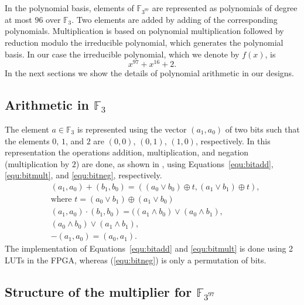 \documentclass{article}
\newcommand{\F}{\mathbb{F}}
\begin{document}
In the polynomial basis, elements of $\F_{3^{97}}$ are represented as
polynomials of degree at most $96$ over $\F_3$. Two elements are added
by adding of the corresponding polynomials. Multiplication is based on polynomial
multiplication followed by reduction modulo the irreducible polynomial,
which generates the polynomial basis. In our case the irreducible
polynomial, which we denote by $f(x)$, is 
\begin{equation}
x^{97}+x^{16}+2.
\label{equ:irreducible}
\end{equation}
In the next sections we show the details of polynomial arithmetic in
our designs.

\subsection{Arithmetic in $\F_{3}$}

The element $a \in \F_{3}$ is represented using the vector $(a_1,
a_0)$ of two bits such that the elements $0$, $1$, and $2$ are
$(0,0)$, $(0,1)$, $(1,0)$, respectively. In this representation the
operations addition, multiplication, and negation (multiplication by
$2$) are done, as shown in \cite{grapag05}, using
Equations~\ref{equ:bitadd}, \ref{equ:bitmult}, and \ref{equ:bitneg},
respectively. 
\begin{align}
\label{equ:bitadd} & (a_1, a_0)+(b_1,b_0)  = ((a_0 \vee b_0) \oplus t, (a_1 \vee b_1) \oplus t),\\
\nonumber & \text{where } t= (a_0 \vee b_1) \oplus (a_1 \vee b_0)\\
\label{equ:bitmult}  & (a_1, a_0) \cdot (b_1,b_0) = ((a_1 \wedge b_0) \vee (a_0 \wedge b_1),\\
\nonumber &  (a_0 \wedge b_0) \vee (a_1 \wedge b_1),\\
\label{equ:bitneg} & -(a_1, a_0) = (a_0, a_1).  
\end{align}
The implementation of Equations~\ref{equ:bitadd} and \ref{equ:bitmult}
is done using 2 LUTs in the FPGA, whereas (\ref{equ:bitneg}) is only a
permutation of bits.

\subsection{Structure of the multiplier for $\F_{3^{97}}$}
\end{document}
